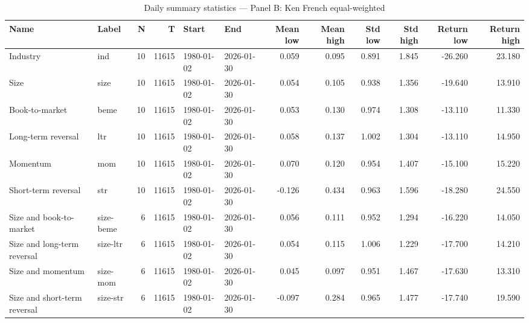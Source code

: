 \begin{table}
\caption{Daily summary statistics --- Panel B: Ken French equal-weighted}
\label{tab:summary_b}
\begin{tabular}{llrrllrrrrrr}
\toprule
Name & Label & N & T & Start & End & Mean low & Mean high & Std low & Std high & Return low & Return high \\
\midrule
Industry & ind & 10 & 11615 & 1980-01-02 & 2026-01-30 & 0.059 & 0.095 & 0.891 & 1.845 & -26.260 & 23.180 \\
Size & size & 10 & 11615 & 1980-01-02 & 2026-01-30 & 0.054 & 0.105 & 0.938 & 1.356 & -19.640 & 13.910 \\
Book-to-market & beme & 10 & 11615 & 1980-01-02 & 2026-01-30 & 0.053 & 0.130 & 0.974 & 1.308 & -13.110 & 11.330 \\
Long-term reversal & ltr & 10 & 11615 & 1980-01-02 & 2026-01-30 & 0.058 & 0.137 & 1.002 & 1.304 & -13.110 & 14.950 \\
Momentum & mom & 10 & 11615 & 1980-01-02 & 2026-01-30 & 0.070 & 0.120 & 0.954 & 1.407 & -15.100 & 15.220 \\
Short-term reversal & str & 10 & 11615 & 1980-01-02 & 2026-01-30 & -0.126 & 0.434 & 0.963 & 1.596 & -18.280 & 24.550 \\
Size and book-to-market & size-beme & 6 & 11615 & 1980-01-02 & 2026-01-30 & 0.056 & 0.111 & 0.952 & 1.294 & -16.220 & 14.050 \\
Size and long-term reversal & size-ltr & 6 & 11615 & 1980-01-02 & 2026-01-30 & 0.054 & 0.115 & 1.006 & 1.229 & -17.700 & 14.210 \\
Size and momentum & size-mom & 6 & 11615 & 1980-01-02 & 2026-01-30 & 0.045 & 0.097 & 0.951 & 1.467 & -17.630 & 13.310 \\
Size and short-term reversal & size-str & 6 & 11615 & 1980-01-02 & 2026-01-30 & -0.097 & 0.284 & 0.965 & 1.477 & -17.740 & 19.590 \\
\bottomrule
\end{tabular}
\end{table}


